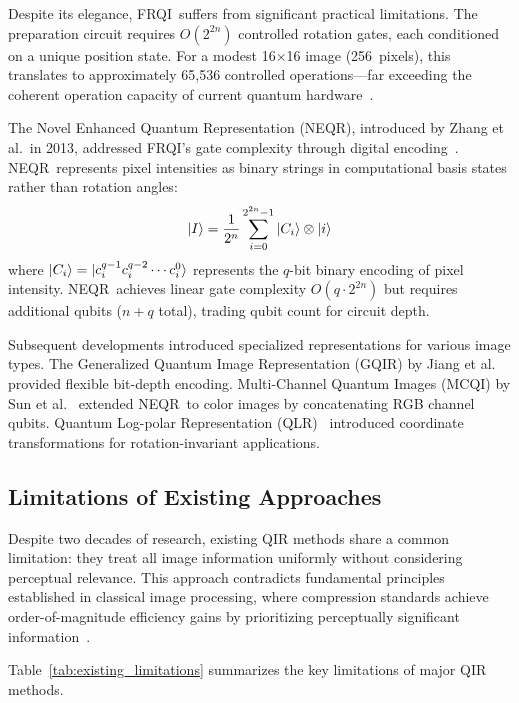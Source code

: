 \documentclass{ipol}
\newcommand{\frqi}{\textsc{FRQI}}
\newcommand{\neqr}{\textsc{NEQR}}
\newcommand{\gqir}{\textsc{GQIR}}
\newcommand{\mcqi}{\textsc{MCQI}}
\begin{document}
Despite its elegance, \frqi\ suffers from significant practical limitations.
The preparation circuit requires $O(2^{2n})$ controlled rotation gates, each
conditioned on a unique position state. For a modest 16$\times$16 image
(256~pixels), this translates to approximately 65,536 controlled
operations---far exceeding the coherent operation capacity of current quantum
hardware~\cite{ref17}.

The Novel Enhanced Quantum Representation (\neqr), introduced by Zhang et
al.\ in 2013, addressed \frqi's gate complexity through digital
encoding~\cite{ref4}. \neqr\ represents pixel intensities as binary strings
in computational basis states rather than rotation angles:
$$\ket{I} = \frac{1}{2^n} \sum_{i=0}^{2^{2n}-1} \ket{C_i} \otimes \ket{i}$$
where $\ket{C_i} = \ket{c_i^{q-1} c_i^{q-2} \cdots c_i^0}$ represents the
$q$-bit binary encoding of pixel intensity. \neqr\ achieves linear gate
complexity $O(q \cdot 2^{2n})$ but requires additional qubits ($n + q$
total), trading qubit count for circuit depth.

Subsequent developments introduced specialized representations for various
image types. The Generalized Quantum Image Representation (\gqir) by Jiang
et al.~\cite{ref18} provided flexible bit-depth encoding. Multi-Channel
Quantum Images (\mcqi) by Sun et al.~\cite{ref8} extended \neqr\ to color
images by concatenating RGB channel qubits. Quantum Log-polar Representation
(QLR)~\cite{ref19} introduced coordinate transformations for
rotation-invariant applications.

\FloatBarrier
\subsection{Limitations of Existing Approaches}

Despite two decades of research, existing QIR methods share a common
limitation: they treat all image information uniformly without considering
perceptual relevance. This approach contradicts fundamental principles
established in classical image processing, where compression standards achieve
order-of-magnitude efficiency gains by prioritizing perceptually significant
information~\cite{ref6}.

Table~\ref{tab:existing_limitations} summarizes the key limitations of major
QIR methods.
\end{document}
